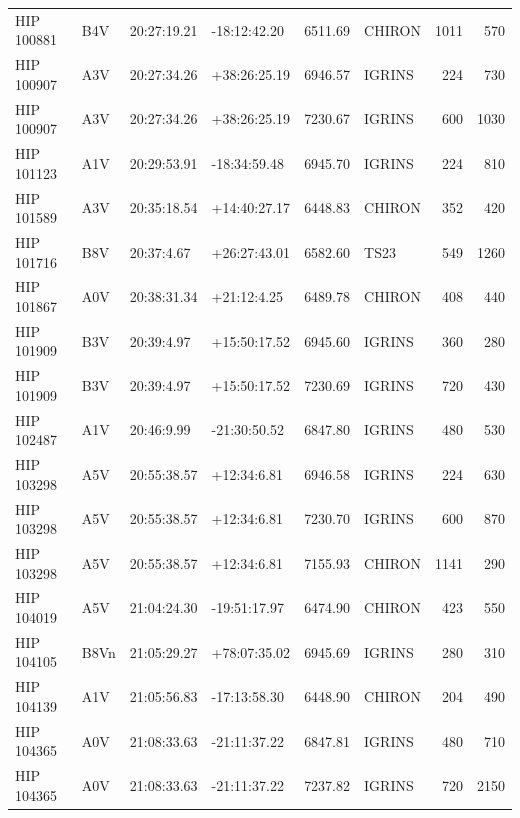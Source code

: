 \documentclass{emulateapj}
\begin{document}
\begin{longtable*}{|l|lllrlrr|}
  HIP 100881 &            B4V &    20:27:19.21 &   -18:12:42.20 &  6511.69 &     CHIRON &     1011 &     570 \\
  HIP 100907 &            A3V &    20:27:34.26 &   +38:26:25.19 &  6946.57 &     IGRINS &      224 &     730 \\
  HIP 100907 &            A3V &    20:27:34.26 &   +38:26:25.19 &  7230.67 &     IGRINS &      600 &    1030 \\
  HIP 101123 &            A1V &    20:29:53.91 &   -18:34:59.48 &  6945.70 &     IGRINS &      224 &     810 \\
  HIP 101589 &            A3V &    20:35:18.54 &   +14:40:27.17 &  6448.83 &     CHIRON &      352 &     420 \\
  HIP 101716 &            B8V &     20:37:4.67 &   +26:27:43.01 &  6582.60 &       TS23 &      549 &    1260 \\
  HIP 101867 &            A0V &    20:38:31.34 &    +21:12:4.25 &  6489.78 &     CHIRON &      408 &     440 \\
  HIP 101909 &            B3V &     20:39:4.97 &   +15:50:17.52 &  6945.60 &     IGRINS &      360 &     280 \\
  HIP 101909 &            B3V &     20:39:4.97 &   +15:50:17.52 &  7230.69 &     IGRINS &      720 &     430 \\
  HIP 102487 &            A1V &     20:46:9.99 &   -21:30:50.52 &  6847.80 &     IGRINS &      480 &     530 \\
  HIP 103298 &            A5V &    20:55:38.57 &    +12:34:6.81 &  6946.58 &     IGRINS &      224 &     630 \\
  HIP 103298 &            A5V &    20:55:38.57 &    +12:34:6.81 &  7230.70 &     IGRINS &      600 &     870 \\
  HIP 103298 &            A5V &    20:55:38.57 &    +12:34:6.81 &  7155.93 &     CHIRON &     1141 &     290 \\
  HIP 104019 &            A5V &    21:04:24.30 &   -19:51:17.97 &  6474.90 &     CHIRON &      423 &     550 \\
  HIP 104105 &           B8Vn &    21:05:29.27 &   +78:07:35.02 &  6945.69 &     IGRINS &      280 &     310 \\
  HIP 104139 &            A1V &    21:05:56.83 &   -17:13:58.30 &  6448.90 &     CHIRON &      204 &     490 \\
  HIP 104365 &            A0V &    21:08:33.63 &   -21:11:37.22 &  6847.81 &     IGRINS &      480 &     710 \\
  HIP 104365 &            A0V &    21:08:33.63 &   -21:11:37.22 &  7237.82 &     IGRINS &      720 &    2150 \\

\end{longtable*}
\end{document}
